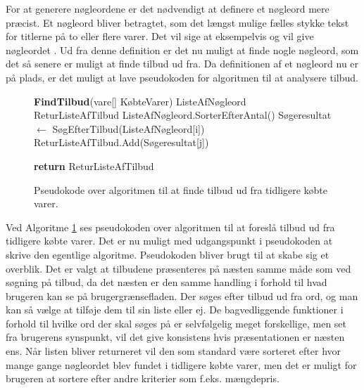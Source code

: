 For at generere nøgleordene er det nødvendigt at definere et nøgleord mere præcist. Et nøgleord bliver betragtet, som det længst mulige fælles stykke tekst for titlerne på to eller flere varer. Det vil sige at eksempelvis  og  vil give nøgleordet . Ud fra denne definition er det nu muligt at finde nogle nøgleord, som det så senere er muligt at finde tilbud ud fra. Da definitionen af et nøgleord nu er på plads, er det muligt at lave pseudokoden for algoritmen til at analysere tilbud.
\begin{figure}[H]
\begin{algorithm}[H]
\textbf{FindTilbud}(vare[] KøbteVarer)\;
ListeAfNøgleord\;
ReturListeAfTilbud\;
ListeAfNøgleord.SorterEfterAntal()\;
{
	Søgeresultat $\leftarrow$ SøgEfterTilbud(ListeAfNøgleord[i])\;
	{
		ReturListeAfTilbud.Add(Søgeresultat[j])\;
	}
}

\textbf{return} ReturListeAfTilbud\;
\caption{Pseudokode over algoritmen til at finde tilbud ud fra tidligere købte varer.}
\label{alg:FindTilbud}

\end{algorithm}
\end{figure}

Ved Algoritme \ref{alg:FindTilbud} ses pseudokoden over algoritmen til at foreslå tilbud ud fra tidligere købte varer. Det er nu muligt med udgangspunkt i pseudokoden at skrive den egentlige algoritme. Pseudokoden bliver brugt til at skabe sig et overblik. Det er valgt at tilbudene præsenteres på næsten samme måde som ved søgning på tilbud, da det næsten er den samme handling i forhold til hvad brugeren kan se på brugergrænsefladen. Der søges efter tilbud ud fra ord, og man kan så vælge at tilføje dem til sin liste eller ej. De bagvedliggende funktioner i forhold til hvilke ord der skal søges på er selvfølgelig meget forskellige, men set fra brugerens synspunkt, vil det give konsistens hvis præsentationen er næsten ens.
Når listen bliver returneret vil den som standard være sorteret efter hvor mange gange nøgleordet blev fundet i tidligere købte varer, men det er muligt for brugeren at sortere efter andre kriterier som f.eks. mængdepris.